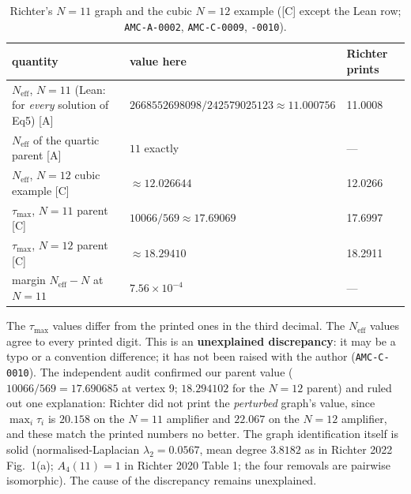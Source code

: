 \documentclass[10pt]{article}
\newcommand{\tier}[1]{\textsf{[#1]}}
\newcommand{\tA}{\tier{A}}
\newcommand{\tC}{\tier{C}}
\newcommand{\Neff}{N_{\mathrm{eff}}}
\begin{document}
\begin{table}[h]\centering\small
\caption{Richter's $N=11$ graph and the cubic $N=12$ example (\tC{} except the Lean row; \texttt{AMC-A-0002}, \texttt{AMC-C-0009}, \texttt{-0010}).}
\begin{tabular}{lll}\toprule
quantity & value here & Richter prints\\\midrule
$\Neff$, $N=11$ (Lean: for \emph{every} solution of Eq5) \tA & $2668552698098/242579025123\approx11.000756$ & 11.0008\\
$\Neff$ of the quartic parent \tA\ & $11$ exactly & ---\\
$\Neff$, $N=12$ cubic example \tC & $\approx12.026644$ & 12.0266\\
$\tau_{\max}$, $N=11$ parent \tC & $10066/569\approx17.69069$ & 17.6997\\
$\tau_{\max}$, $N=12$ parent \tC & $\approx18.29410$ & 18.2911\\
margin $\Neff-N$ at $N=11$ & $7.56\times10^{-4}$ & ---\\\bottomrule
\end{tabular}
\end{table}
The $\tau_{\max}$ values differ from the printed ones in the third decimal. The $\Neff$ values agree to every printed digit. This is an \textbf{unexplained discrepancy}: it may be a typo or a convention difference; it has not been raised with the author (\texttt{AMC-C-0010}).
The independent audit confirmed our parent value ($10066/569=17.690685$ at vertex 9; $18.294102$ for the $N=12$ parent) and ruled out one explanation: Richter did not print the
\emph{perturbed} graph's value, since $\max_i\tau_i$ is $20.158$ on the $N=11$ amplifier and $22.067$ on the $N=12$ amplifier, and these match the printed numbers no better. The graph identification itself is solid (normalised-Laplacian
$\lambda_2=0.0567$, mean degree $3.8182$ as in Richter 2022 Fig.~1(a); $A_4(11)=1$ in Richter 2020 Table 1; the four removals are pairwise isomorphic). The cause of the discrepancy remains unexplained.
\end{document}
